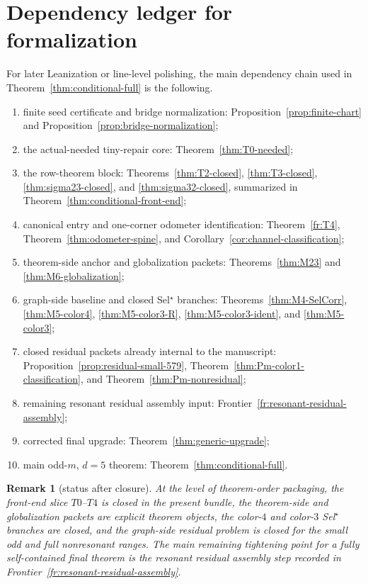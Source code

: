 \documentclass[11pt]{article}
\newtheorem{remark}[theorem]{Remark}
\begin{document}
\section{Dependency ledger for formalization}

For later Leanization or line-level polishing, the main dependency chain used in
Theorem~\ref{thm:conditional-full} is the following.
\begin{enumerate}[label=\textup{(D\arabic*)},leftmargin=3.0em]
\item finite seed certificate and bridge normalization:
      Proposition~\ref{prop:finite-chart} and
      Proposition~\ref{prop:bridge-normalization};
\item the actual-needed tiny-repair core:
      Theorem~\ref{thm:T0-needed};
\item the row-theorem block:
      Theorems~\ref{thm:T2-closed}, \ref{thm:T3-closed},
      \ref{thm:sigma23-closed}, and \ref{thm:sigma32-closed}, summarized in
      Theorem~\ref{thm:conditional-front-end};
\item canonical entry and one-corner odometer identification:
      Theorem~\ref{fr:T4}, Theorem~\ref{thm:odometer-spine}, and
      Corollary~\ref{cor:channel-classification};
\item theorem-side anchor and globalization packets:
      Theorems~\ref{thm:M23} and \ref{thm:M6-globalization};
\item graph-side baseline and closed Sel$^{\star}$ branches:
      Theorems~\ref{thm:M4-SelCorr}, \ref{thm:M5-color4},
      \ref{thm:M5-color3-R}, \ref{thm:M5-color3-ident}, and
      \ref{thm:M5-color3};
\item closed residual packets already internal to the manuscript:
      Proposition~\ref{prop:residual-small-579},
      Theorem~\ref{thm:Pm-color1-classification}, and
      Theorem~\ref{thm:Pm-nonresidual};
\item remaining resonant residual assembly input:
      Frontier~\ref{fr:resonant-residual-assembly};
\item corrected final upgrade:
      Theorem~\ref{thm:generic-upgrade};
\item main odd-$m$, $d=5$ theorem:
      Theorem~\ref{thm:conditional-full}.
\end{enumerate}

\begin{remark}[status after closure]
At the level of theorem-order packaging, the front-end slice $T0$--$T4$ is
closed in the present bundle, the theorem-side and globalization packets are
explicit theorem objects, the color-$4$ and color-$3$ Sel$^{\star}$ branches
are closed, and the graph-side residual problem is closed for the small odd and
full nonresonant ranges.
The main remaining tightening point for a fully self-contained final theorem is
the resonant residual assembly step recorded in
Frontier~\ref{fr:resonant-residual-assembly}.
\end{remark}
\end{document}
